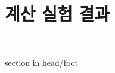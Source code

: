 \documentclass[10pt,slidestop,compress,mathserif,notheorems]{beamer}
\newif\ifen
\theoremstyle{definition}
\theoremstyle{definition}
\begin{document}
\section{계산 실험 결과}
\fi

\ifen{
\begin{frame}[plain]
  \vspace{9em}
\begin{center}
~
\begin{beamercolorbox}[wd=.6\textwidth,sep=8pt,center,shadow=false,rounded=true]{section in head/foot}
    \usebeamerfont{title} \insertsectionhead \par%
  \end{beamercolorbox}
~
\end{center}
\end{frame}
}
\else{
\begin{frame}[plain]
  \vspace{9em}
\begin{center}
~
\begin{beamercolorbox}[wd=.6\textwidth,sep=8pt,center,shadow=false,rounded=true]{section in head/foot}
     \insertsectionhead \par%
  \end{beamercolorbox}
~
\end{center}
\end{frame}
}
\fi
\end{document}
